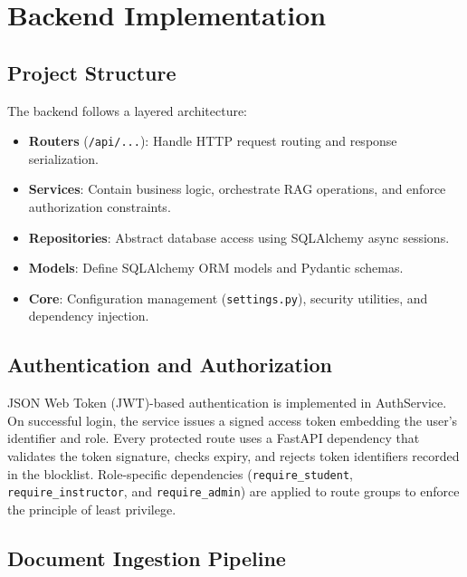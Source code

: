 \documentclass[12pt, a4paper, oneside]{report}
\let\oldsection\section
\renewcommand{\section}{%
  \addtocontents{toc}{\protect\needspace{4\baselineskip}}%
  \oldsection
}
\let\oldsubsection\subsection
\renewcommand{\subsection}{%
  \addtocontents{toc}{\protect\needspace{3\baselineskip}}%
  \oldsubsection
}
\begin{document}
\newpage

\section{Backend Implementation}

\subsection{Project Structure}

The backend follows a layered architecture:

\begin{itemize}
  \item \textbf{Routers} (\texttt{/api/...}): Handle HTTP request routing and response serialization.
  \item \textbf{Services}: Contain business logic, orchestrate RAG operations, and enforce authorization constraints.
  \item \textbf{Repositories}: Abstract database access using SQLAlchemy async sessions.
  \item \textbf{Models}: Define SQLAlchemy ORM models and Pydantic schemas.
  \item \textbf{Core}: Configuration management (\texttt{settings.py}), security utilities, and dependency injection.
\end{itemize}

\subsection{Authentication and Authorization}

JSON Web Token (JWT)-based authentication is implemented in AuthService. On successful login, the service issues a signed access token embedding the user's identifier and role. Every protected route uses a FastAPI dependency that validates the token signature, checks expiry, and rejects token identifiers recorded in the blocklist. Role-specific dependencies (\texttt{require\_student}, \texttt{require\_instructor}, and \texttt{require\_admin}) are applied to route groups to enforce the principle of least privilege.

\newpage
\subsection{Document Ingestion Pipeline}
\end{document}
